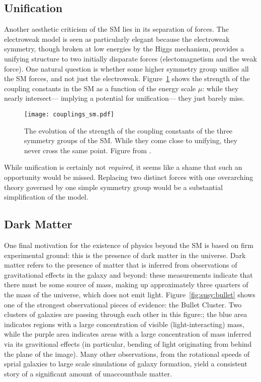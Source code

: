 \subsection{Unification}

Another aesthetic criticism of the SM lies in its separation of forces. The electroweak model is seen as particularly elegant because the electroweak symmetry, though broken at low energies by the Higgs mechanism, provides a unifying structure to two initially disparate forces (electomagnetism and the weak force). One natural question is whether some higher symmetry group unifies all the SM forces, and not just the electroweak. Figure~\ref{fig:susy:couplings_sm} shows the strength of the coupling constants in the SM as a function of the energy scale $\mu$: while they nearly intersect--- implying a potential for unification--- they just barely miss.



\begin{figure}
\centering
\texttt{[image: couplings\_sm.pdf]}
\label{fig:susy:couplings_sm}
\caption{The evolution of the strength of the coupling constants of the three symmetry groups of the SM. While they come close to unifying, they never cross the same point. Figure from \cite{susypheno}.}
\end{figure}


While unification is certainly not \textit{required}, it seems like a shame that such an opportunity would be missed. Replacing two distinct forces with one overarching theory governed by one simple symmetry group would be a substantial simplification of the model.

\subsection{Dark Matter}


One final motivation for the existence of physics beyond the SM is based on firm experimental ground: this is the presence of dark matter in the universe. Dark matter refers to the presence of matter that is inferred from observations of gravitational effects in the galaxy and beyond: these measurements indicate that there must be some source of mass, making up approximately three quarters of the mass of the universe, which does not emit light. Figure~\ref{fig:susy:bullet} shows one of the strongest observational pieces of evidence: the Bullet Cluster. Two clusters of galaxies are passing through each other in this figure:; the blue area indicates regions with a large concentration of visible (light-interacting) mass, while the purple area indicates areas with a large concentration of mass inferred via its gravitional effects (in particular, bending of light originating from behind the plane of the image). Many other observations, from the rotational speeds of sprial galaxies to large scale simulations of galaxy formation, yield a consistent story of a significant amount of unaccountbale matter.



